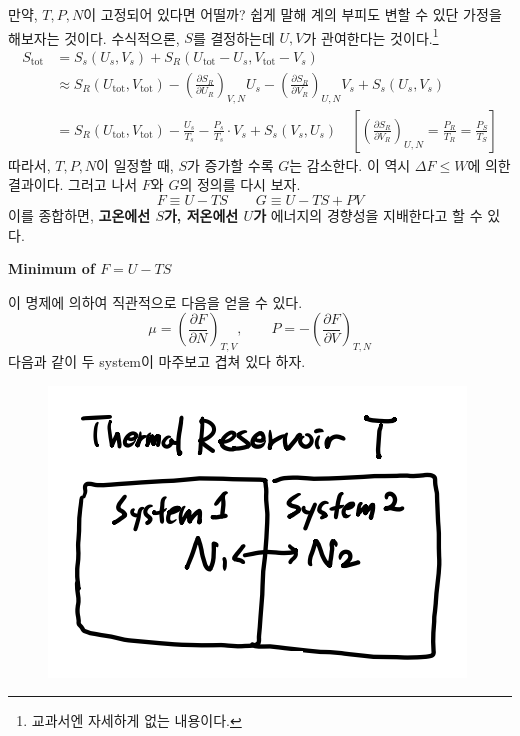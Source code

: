 \documentclass{article}
\begin{document}
만약, $T,P,N$이 고정되어 있다면 어떨까? 쉽게 말해 계의 부피도 변할 수 있단 가정을 해보자는 것이다. 수식적으론, $S$를 결정하는데 $U, V$가 관여한다는 것이다.\footnote{교과서엔 자세하게 없는 내용이다.}
\begin{align}
    S_{\text{tot}} &= S_s(U_s , V_s) + S_R (U_{\text{tot}} - U_s , V_{\text{tot}} - V_s)\\ \nonumber
    &\approx S_R(U_{\text{tot}}, V_{\text{tot}}) - \left( \frac{\partial S_R}{\partial U_R} \right)_{V,N} U_s - \left( \frac{\partial S_R}{\partial V_R} \right)_{U,N} V_s + S_s(U_s, V_s)\\
    &= S_R(U_{\text{tot}}, V_{\text{tot}}) - \frac{U_s}{T_s} - \frac{P_s}{T_s} \cdot V_s + S_s(V_s, U_s) \quad \left[ \left( \frac{\partial S_R}{\partial V_R} \right)_{U,N} = \frac{P_R}{T_R} = \frac{P_S}{T_S} \right]
\end{align}
따라서, $T,P,N$이 일정할 때, $S$가 증가할 수록 $G$는 감소한다. 이 역시 $\Delta F \leq W$에 의한 결과이다. 그러고 나서 $F$와 $G$의 정의를 다시 보자.
\begin{equation}
    F \equiv U - TS \qquad G \equiv U - TS + PV
\end{equation}
이를 종합하면, \textbf{고온에선 $S$가, 저온에선 $U$가} 에너지의 경향성을 지배한다고 할 수 있다.

\vspace{3mm}\noindent
\textbf{Minimum of $F=U-TS$}

\begin{center}
\end{center}
이 명제에 의하여 직관적으로 다음을 얻을 수 있다.
\begin{equation}
    \mu = \left( \frac{\partial F}{\partial N} \right)_{T,V}, \qquad P = - \left( \frac{\partial F}{\partial V} \right)_{T,N}
\end{equation}
다음과 같이 두 system이 마주보고 겹쳐 있다 하자.

\begin{figure}[h]
    \centering
    \includegraphics[width=0.3\linewidth]{images/fig2_2.png}
\end{figure}
\end{document}
